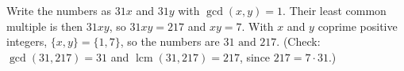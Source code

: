 Write the numbers as $31x$ and $31y$ with $\gcd(x,y)=1$. Their least common multiple is then $31xy$, so $31xy=217$ and $xy=7$. With $x$ and $y$ coprime positive integers, $\{x,y\}=\{1,7\}$, so the numbers are $\boxed{31\text{ and }217}$. (Check: $\gcd(31,217)=31$ and $\operatorname{lcm}(31,217)=217$, since $217=7\cdot31$.)
